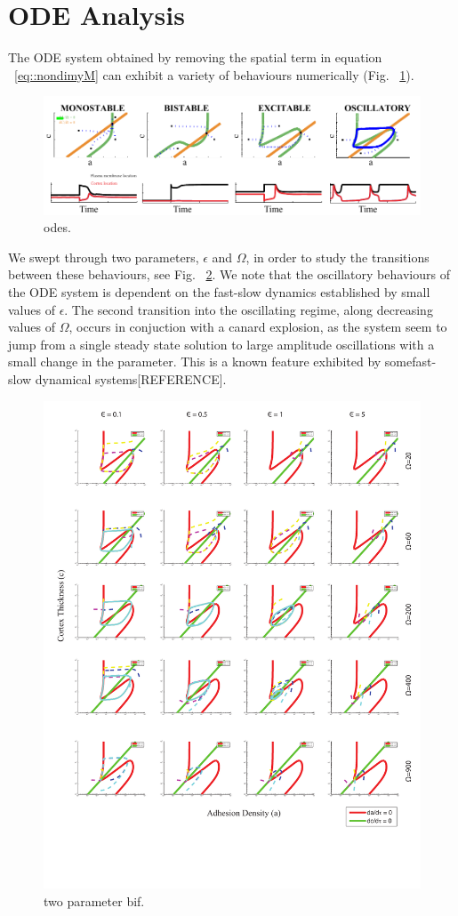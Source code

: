 \section{ODE Analysis}

The ODE system obtained by removing the spatial term in equation ~\ref{eq::nondimyM} can exhibit a variety of behaviours numerically (Fig. ~\ref{fig::odeanal}). 
\begin{figure}[h]
\centering
\captionsetup{width=\linewidth}
\includegraphics[width=4.5in]{Project2/figs/ODE_Analysis.pdf}
\caption{odes.}
\label{fig::odeanal}
\end{figure}

We swept through two parameters, $\epsilon$ and $\Omega$, in order to study the transitions between these behaviours, see Fig. ~\ref{fig::epsomega}. We note that the oscillatory behaviours of the ODE system is dependent on the fast-slow dynamics established by small values of $\epsilon$. The second transition into the oscillating regime, along decreasing values of $\Omega$,  occurs in conjuction with a canard explosion, as the system seem to jump from a single steady state solution to large amplitude oscillations with a small change in the parameter. This is a known feature exhibited by somefast-slow dynamical systems[REFERENCE].

\begin{figure}[h]
\centering
\captionsetup{width=\linewidth}
\includegraphics[width=4.5in]{Project2/figs/Epislon_omega.pdf}
\caption{two parameter bif.}
\label{fig::epsomega}
\end{figure}
 
